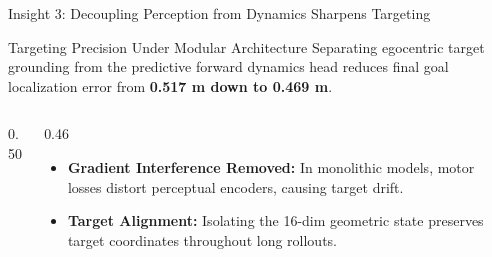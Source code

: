 \documentclass[aspectratio=169, 10pt]{beamer}
\begin{document}
\begin{frame}{Insight 3: Decoupling Perception from Dynamics Sharpens Targeting}
  \begin{block}{Targeting Precision Under Modular Architecture}
    Separating egocentric target grounding from the predictive forward dynamics head reduces final goal localization error from \textbf{0.517 m down to 0.469 m}.
  \end{block}
  \vspace{-0.2cm}
  \begin{columns}[T]
    \begin{column}{0.50\textwidth}
      \centering
    \end{column}
    \begin{column}{0.46\textwidth}
      \begin{itemize}
        \item \textbf{Gradient Interference Removed:} In monolithic models, motor losses distort perceptual encoders, causing target drift.
        \item \textbf{Target Alignment:} Isolating the 16-dim geometric state preserves target coordinates throughout long rollouts.
      \end{itemize}
    \end{column}
  \end{columns}
\end{frame}
\end{document}

